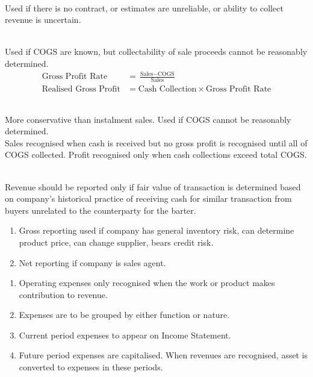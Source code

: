 \begin{method} \\
Used if there is no contract, or estimates are unreliable, or ability to collect revenue is uncertain.
\end{method}

\begin{method} \\
Used if COGS are known, but collectability of sale proceeds cannot be reasonably determined.
\begin{align}
\text{Gross Profit Rate} &= \frac{\text{Sales} - \text{COGS}}{\text{Sales}} \nonumber \\
\text{Realised Gross Profit} &= \text{Cash Collection} \times \text{Gross Profit Rate} \nonumber
\end{align}
\end{method}

\begin{method} \\
More conservative than instalment sales. Used if COGS cannot be reasonably determined.\\
Sales recognised when cash is received but no gross profit is recognised until all of COGS collected. Profit recognised only when cash collections exceed total COGS.
\end{method}

\begin{method} \\
Revenue should be reported only if fair value of transaction is determined based on company’s historical practice of receiving cash for similar transaction from buyers unrelated to the counterparty for the barter.
\end{method}

\begin{method} 
\begin{enumerate}[label=\roman*.]
\setlength{\itemsep}{0pt}
\item Gross reporting used if company has general inventory risk, can determine product price, can change supplier, bears credit risk. 
\item Net reporting if company is sales agent.
\end{enumerate}
\end{method}

\begin{definition} 
\begin{enumerate}[label=\roman*.]
\setlength{\itemsep}{0pt}
\item Operating expenses only recognised when the work or product makes contribution to revenue.
\item Expenses are to be grouped by either function or nature.
\item Current period expenses to appear on Income Statement.
\item Future period expenses are capitalised. When revenues are recognised, asset is converted to expenses in these periods.
\end{enumerate}
\end{definition}


